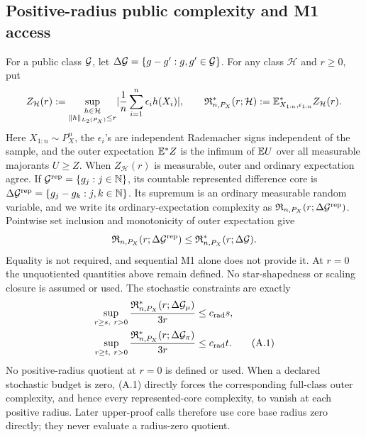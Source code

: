 \subsection{Positive-radius public complexity and M1 access}

For a public class \(\mathcal G\), let
\(\Delta\mathcal G=\{g-g':g,g'\in\mathcal G\}\).  For any class \(\mathcal H\) and
\(r\ge0\), put
\[
 Z_{\mathcal H}(r):=
   \sup_{\substack{h\in\mathcal H\\ \lVert h\rVert_{L_2(P_X)}\le r}}
   \lvert \frac1n\sum_{i=1}^n\epsilon_i h(X_i)\rvert,\qquad
 \mathfrak R^{*}_{n,P_X}(r;\mathcal H)
 :=\mathbb E^{*}_{X_{1:n},\epsilon_{1:n}} Z_{\mathcal H}(r).
\]
Here \(X_{1:n}\sim P_X^n\), the \(\epsilon_i\)'s are independent Rademacher
signs independent of the sample, and the outer expectation \(\mathbb E^*Z\) is the
infimum of \(\mathbb E U\) over all measurable majorants \(U\ge Z\).  When
\(Z_{\mathcal H}(r)\) is measurable, outer and ordinary expectation agree.
If \(\mathcal G^{\rm rep}=\{g_j:j\in\mathbb N\}\), its countable represented difference core is
\(\Delta\mathcal G^{\rm rep}=\{g_j-g_k:j,k\in\mathbb N\}\).  Its supremum is an ordinary measurable random variable, and we write its ordinary-expectation
complexity as \(\mathfrak R_{n,P_X}(r;\Delta\mathcal G^{\rm rep})\).  Pointwise
set inclusion and monotonicity of outer expectation give
\[
 \mathfrak R_{n,P_X}(r;\Delta\mathcal G^{\rm rep})
 \le \mathfrak R^{*}_{n,P_X}(r;\Delta\mathcal G).
\]
Equality is not required, and sequential M1 alone does not provide it.  At
\(r=0\) the unquotiented quantities above remain defined.  No
star-shapedness or scaling closure is assumed or used.  The stochastic
constraints are exactly
\begin{align}
 \sup_{r\ge s,\ r>0}
 \frac{\mathfrak R^{*}_{n,P_X}(r;\Delta\mathcal G_\mu)}{3r}
 &\le c_{\rm rad}s,\nonumber\\
 \sup_{r\ge t,\ r>0}
 \frac{\mathfrak R^{*}_{n,P_X}(r;\Delta\mathcal G_\pi)}{3r}
 &\le c_{\rm rad}t.
 \tag{A.1}
\end{align}
No positive-radius quotient at \(r=0\) is defined or used.  When a declared
stochastic budget is zero, (A.1) directly forces the corresponding full-class
outer complexity, and hence every represented-core complexity, to vanish at
each positive radius.  Later upper-proof calls therefore use core base radius
zero directly; they never evaluate a radius-zero quotient.

